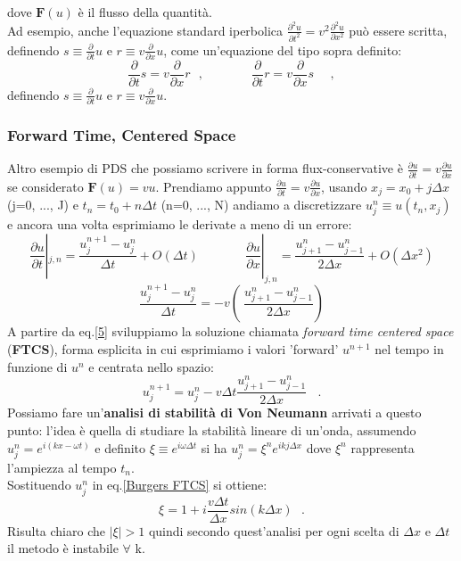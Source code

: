 \documentclass{article}
\begin{document}
	dove $\textbf{F}(u)$ è il flusso della quantità.\\
	Ad esempio, anche l'equazione standard iperbolica $\displaystyle \frac{\partial^2 u}{\partial t^2} = v^2 \frac{\partial^2 u}{\partial x^2}$ può essere scritta, definendo $s\equiv\frac{\partial}{\partial t}u$ e $r\equiv v \frac{\partial}{\partial x}u$, come un'equazione del tipo sopra definito:
	\[ \frac{\partial}{\partial t}s = v\frac{\partial}{\partial x}r \ \ \ ,\ \ \ \ \ \ \ \ \ \ \ \ \ \ \ \ \  \frac{\partial}{\partial t}r = v\frac{\partial}{\partial x}s\ \ \ \ \ \ , \]
	definendo $s\equiv\frac{\partial}{\partial t}u$ e $r\equiv v \frac{\partial}{\partial x}u$.\\
	
	
	\vspace{1cm}
	\subsubsection{Forward Time, Centered Space}
	Altro esempio di PDS che possiamo scrivere in forma flux-conservative è $\boxed{\displaystyle \frac{\partial u}{\partial t} = v \frac{\partial u}{\partial x}}$ se considerato $\textbf{F}(u)=vu$.
	Prendiamo appunto $\displaystyle \frac{\partial u}{\partial t} = v \frac{\partial u}{\partial x}$, usando $x_j=x_0+j\Delta x$ (j=0, ..., J) e $t_n=t_0+n\Delta t$ (n=0, ..., N) andiamo a discretizzare $u^n_j \equiv u(t_n, x_j)$ e ancora una volta esprimiamo le derivate a meno di un errore:
	\[\frac{\partial u}{\partial t}|_{j, n} = \frac{u_j^{n+1} - u_j^{n}}{\Delta t} + O(\Delta t)\ \ \ \ \ \ \ \ \ \ \ \ \ \ \ \ \ \frac{\partial u}{\partial x}|_{j, n} = \frac{u_{j+1}^{n} - u_{j-1}^{n}}{2\Delta x} + O(\Delta x^2)\]
	\begin{equation}\label{5}
		\frac{u_j^{n+1} - u_j^{n}}{\Delta t} = -v\left(\ \frac{u_{j+1}^{n} - u_{j-1}^{n}}{2\Delta x}\right)
	\end{equation}
	A partire da eq.\ref{5} sviluppiamo la soluzione chiamata \emph{forward time centered space} (\textbf{FTCS}), forma esplicita in cui esprimiamo i valori 'forward' $u^{n+1}$ nel tempo in funzione di $u^{n}$ e centrata nello spazio:
	\begin{equation}\label{Burgers FTCS}
		u^{n+1}_j = u^n_j - v \Delta t \frac{u_{j+1}^{n} - u_{j-1}^{n}}{2\Delta x}\ \ \ \ .
	\end{equation}
	Possiamo fare un'\textbf{analisi di stabilità di Von Neumann} arrivati a questo punto: l'idea è quella di studiare la stabilità lineare di un'onda, assumendo $u^n_j = e^{i(kx-\omega t)}$ e definito $\xi\equiv e^{i\omega \Delta t}$ si ha $\displaystyle u^n_j=\xi^n e^{ikj\Delta x}$ dove $\xi^n$ rappresenta l'ampiezza al tempo $t_n$.\\
	Sostituendo $u^n_j$ in eq.\ref{Burgers FTCS} si ottiene:
	\[\xi = 1+ i \frac{v\Delta t }{\Delta x} sin(k\Delta x)\ \ \ .\]
	Risulta chiaro che $|\xi|>1$ quindi secondo quest'analisi per ogni scelta di $\Delta x$ e $\Delta t$ il metodo è instabile $\forall$ k.
	
\end{document}
